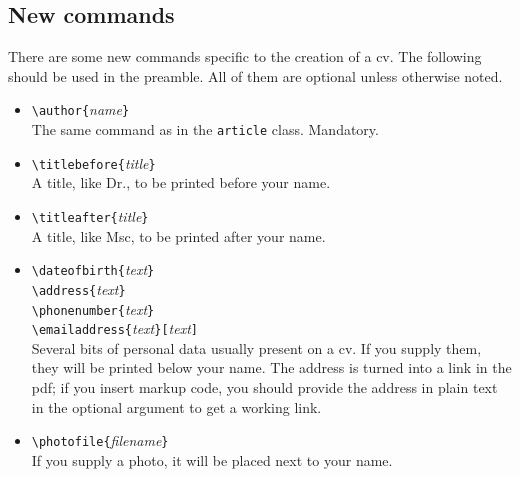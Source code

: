 \documentclass{article}
\begin{document}
\subsection{New commands}
There are some new commands specific to the creation of a cv.
The following should be used in the preamble.
All of them are optional unless otherwise noted.
\begin{itemize}
	\item \texttt{\textbackslash{}author\{}\textit{name}\texttt{\}} \\
		The same command as in the \texttt{article} class. Mandatory.
	\item \texttt{\textbackslash{}titlebefore\{}\textit{title}\texttt{\}} \\
		A title, like Dr., to be printed before your name.
	\item \texttt{\textbackslash{}titleafter\{}\textit{title}\texttt{\}} \\
		A title, like Msc, to be printed after your name.
	\item \texttt{\textbackslash{}dateofbirth\{}\textit{text}\texttt{\}} \\
	      \texttt{\textbackslash{}address\{}\textit{text}\texttt{\}} \\
	      \texttt{\textbackslash{}phonenumber\{}\textit{text}\texttt{\}} \\
	      \texttt{\textbackslash{}emailaddress\{}\textit{text}\texttt{\}[}\textit{text}\texttt{]} \\
		Several bits of personal data usually present on a cv.
		If you supply them, they will be printed below your name.
		The address is turned into a link in the pdf; if you insert markup code, you should provide the address in plain text in the optional argument to get a working link.
	\item \texttt{\textbackslash{}photofile\{}\textit{filename}\texttt{\}} \\
		If you supply a photo, it will be placed next to your name.
\end{itemize}
\end{document}
